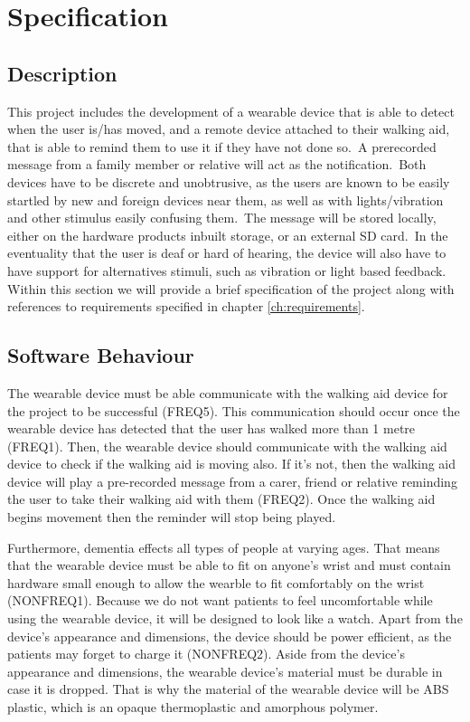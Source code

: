 \chapter{Specification}\label{ch:specification}
    \section{Description}

        This project includes the development of a wearable device that is able to detect when the user is/has moved,
        and a remote device attached to their walking aid, that is able to remind them to use it if they have not done
        so.\ A prerecorded message from a family member or relative will act as the notification.\ Both devices have to
        be discrete and unobtrusive, as the users are known to be easily startled by new and foreign devices near them,
        as well as with lights/vibration and other stimulus easily confusing them.\ The message will be stored locally,
        either on the hardware products inbuilt storage, or an external SD card.\ In the eventuality that the user is
        deaf or hard of hearing, the device will also have to have support for alternatives stimuli, such as vibration
        or light based feedback. Within this section we will provide a brief specification of the project along with references to requirements specified in chapter \ref{ch:requirements}.

    \section{Software Behaviour}

        The wearable device must be able communicate with the walking aid device for the project to be successful (FREQ5). This communication should occur once the wearable device has detected that the user has walked more than 1 metre (FREQ1). Then, the wearable device should communicate with the walking aid device to check if the walking aid is moving also. If it's not, then the walking aid device will play a pre-recorded message from a carer, friend or relative reminding the user to take their walking aid with them (FREQ2). Once the walking aid begins movement then the reminder will stop being played.

        Furthermore, dementia effects all types of people at varying ages. That means that the wearable device must be able to
        fit on anyone's wrist and must contain hardware small enough to allow the wearble to fit comfortably on the wrist (NONFREQ1). Because we do not want patients to feel uncomfortable while using the wearable device, it
        will be designed to look like a watch. Apart from the device's appearance and dimensions, the device should be power efficient, as the
        patients may forget to charge it (NONFREQ2). Aside from the device's appearance and dimensions, the wearable device's material must be durable in  case it is dropped. That is why the material of the wearable device will be ABS plastic, which is an opaque thermoplastic and amorphous polymer.

